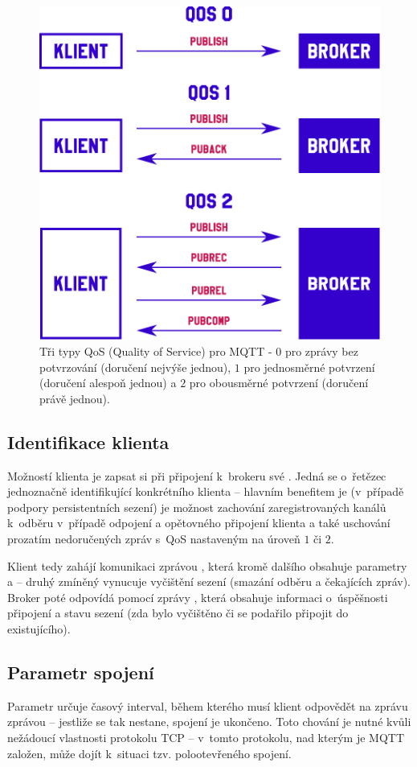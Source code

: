 \begin{figure}
    \centering
    \includegraphics[width=.6\textwidth]{figures/qos.pdf}
    \caption{Tři typy QoS (Quality of Service) pro MQTT - $0$ pro zprávy bez potvrzování (doručení nejvýše jednou),
    $1$ pro jednosměrné potvrzení (doručení alespoň jednou) a
    $2$ pro obousměrné potvrzení (doručení právě jednou).}
    \label{fig:mqtt-qos}
\end{figure}

\subsection{Identifikace klienta }\label{subsec:identifikace-klienta-client-id}
Možností klienta je zapsat si při připojení k~brokeru své .
Jedná se o~řetězec jednoznačně identifikující konkrétního klienta -- hlavním benefitem je (v~případě podpory
persistentních sezení) je možnost zachování zaregistrovaných kanálů k~odběru v~případě odpojení a
opětovného připojení klienta a také uschování prozatím nedoručených zpráv s~QoS nastaveným na úroveň $1$ či $2$.

Klient tedy zahájí komunikaci zprávou , která kromě dalšího obsahuje parametry  a  -- druhý zmíněný vynucuje vyčištění sezení (smazání odběru a čekajících zpráv).
Broker poté odpovídá pomocí zprávy , která obsahuje informaci o~úspěšnosti připojení a stavu sezení (zda
bylo vyčištěno či se podařilo připojit do existujícího).

\subsection{Parametr spojení }\label{subsec:parametr-spojeni-keep-alive}
Parametr  určuje časový interval, během kterého musí klient odpovědět na zprávu  zprávou
 -- jestliže se tak nestane, spojení je ukončeno.
Toto chování je nutné kvůli nežádoucí vlastnosti protokolu TCP --
v~tomto protokolu, nad kterým je MQTT založen, může dojít k~situaci tzv. polootevřeného spojení.

